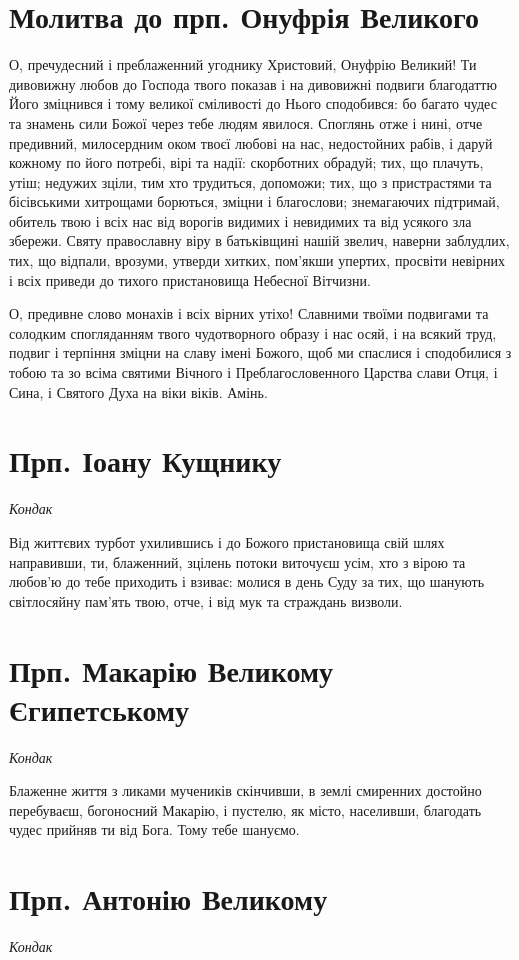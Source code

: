\documentclass[chapters.tex]{subfiles}
\begin{document}
\section{Молитва до прп. Онуфрія Великого}
О, пречудесний і преблаженний угоднику Христовий, Онуфрію Великий! Ти дивовижну любов до Господа твого показав і на дивовижні подвиги благодаттю Його зміцнився і тому великої сміливості до Нього сподобився: бо багато чудес та знамень сили Божої через тебе людям явилося. Споглянь отже і нині, отче предивний, милосердним оком твоєї любові на нас, недостойних рабів, і даруй кожному по його потребі, вірі та надії: скорботних обрадуй; тих, що плачуть, утіш; недужих зціли, тим хто трудиться, допоможи; тих, що з пристрастями та бісівськими хитрощами борються, зміцни і благослови; знемагаючих підтримай, обитель твою і всіх нас від ворогів видимих і невидимих та від усякого зла збережи. Святу православну віру в батьківщині нашій звелич, наверни заблудлих, тих, що відпали, врозуми, утверди хитких, пом’якши упертих, просвіти невірних і всіх приведи до тихого пристановища Небесної Вітчизни.

О, предивне слово монахів і всіх вірних утіхо! Славними твоїми подвигами та солодким спогляданням твого чудотворного образу і нас осяй, і на всякий труд, подвиг і терпіння зміцни на славу імені Божого, щоб ми спаслися і сподобилися з тобою та зо всіма святими Вічного і Преблагословенного Царства слави Отця, і Сина, і Святого Духа на віки віків. Амінь.

\section{Прп. Іоану Кущнику}
\emph{Кондак}

Від життєвих турбот ухилившись і до Божого пристановища свій шлях направивши, ти, блаженний, зцілень потоки виточуєш усім, хто з вірою та любов’ю до тебе приходить і взиває: молися в день Суду за тих, що шанують світлосяйну пам’ять твою, отче, і від мук та страждань визволи.

\section{Прп. Макарію Великому Єгипетському}
\emph{Кондак}

Блаженне життя з ликами мучеників скінчивши, в землі смиренних достойно перебуваєш, богоносний Макарію, і пустелю, як місто, населивши, благодать чудес прийняв ти від Бога. Тому тебе шануємо.

\section{Прп. Антонію Великому}
\emph{Кондак}
\end{document}
